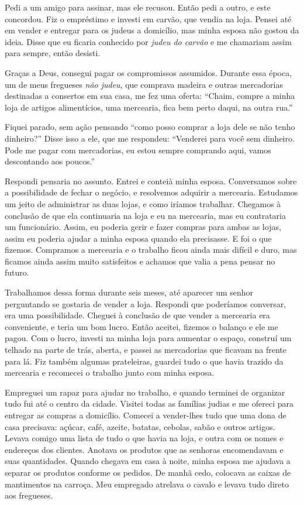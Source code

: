 Pedi a um amigo para assinar, mas ele recusou. Então pedi a outro, e
este concordou. Fiz o empréstimo e investi em carvão, que vendia na loja.
Pensei até em vender e entregar para os judeus a domicílio, mas minha
esposa não gostou da ideia. Disse que eu ficaria conhecido por
\textit{judeu do carvão} e me chamariam assim para sempre, então desisti.

Graças a Deus, consegui pagar os compromissos assumidos. Durante essa época, um 
de meus fregueses \textit{não judeu}, que comprava madeira e outras
mercadorias destinadas a consertos em sua casa, me fez uma oferta: ``Chaim,
compre a minha loja de artigos alimentícios, uma mercearia, fica bem
perto daqui, na outra rua.''

Fiquei parado, sem ação pensando ``como posso comprar a loja dele se
não tenho dinheiro?'' Disse isso a ele, que me respondeu: ``Venderei
para você sem dinheiro. Pode me pagar com mercadorias, eu estou
sempre comprando aqui, vamos descontando aos poucos.''

Respondi pensaria no assunto. Entrei e conteià minha esposa. Conversamos sobre a possibilidade de
fechar o negócio, e resolvemos adquirir a mercearia. Estudamos um
jeito de administrar as duas lojas, e como iríamos trabalhar. Chegamos à
conclusão de que ela continuaria na loja e eu na mercearia, mas
eu contrataria um funcionário. Assim, eu poderia gerir e fazer compras para ambas as lojas, 
assim eu poderia ajudar a minha esposa quando ela precisasse. E foi o que fizemos. Compramos a mercearia
e o trabalho ficou ainda mais difícil e duro, mas ficamos ainda assim 
muito satisfeitos e achamos que valia a pena pensar no futuro.

Trabalhamos dessa forma durante seis meses, até aparecer um senhor perguntando se 
gostaria de vender a loja. Respondi que poderíamos conversar, era uma possibilidade.
Cheguei à conclusão de que vender a mercearia era conveniente, e teria um bom lucro. 
Então aceitei, fizemos o balanço e ele me pagou. Com o lucro, investi
na minha loja para aumentar o espaço, construí um telhado na parte de trás, aberta, 
e passei as mercadorias que ficavam na frente para lá. Fiz também 
algumas prateleiras, guardei tudo o que havia trazido da mercearia e
recomecei o trabalho junto com minha esposa.

Empreguei um rapaz para ajudar no trabalho, e quando terminei de organizar tudo fui
até o centro da cidade. Visitei todas as famílias judias e me ofereci para entregar as compras a
domicílio. Comecei a vender-lhes tudo que uma dona de casa precisava:
açúcar, café, azeite, batatas, cebolas, sabão e outros artigos. Levava
comigo uma lista de tudo o que havia na loja, e outra com os nomes e endereços
dos clientes. Anotava os produtos que as senhoras encomendavam e suas 
quantidades. Quando chegava em casa à noite, minha
esposa me ajudava a separar os produtos conforme os pedidos. De manhã
cedo, colocava as caixas de mantimentos na carroça. Meu empregado
atrelava o cavalo e levava tudo direto aos fregueses.

